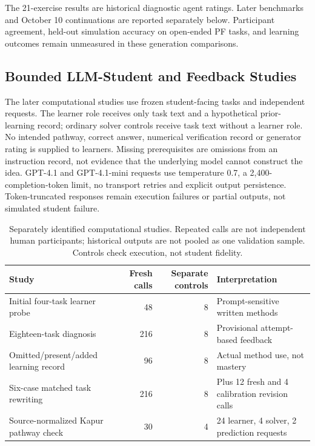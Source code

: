 The 21-exercise results are historical diagnostic agent ratings. Later benchmarks and October 10 continuations are reported separately below. Participant agreement, held-out simulation accuracy on open-ended PF tasks, and learning outcomes remain unmeasured in these generation comparisons.

\subsection{Bounded LLM-Student and Feedback Studies}

The later computational studies use frozen student-facing tasks and independent requests. The learner role receives only task text and a hypothetical prior-learning record; ordinary solver controls receive task text without a learner role. No intended pathway, correct answer, numerical verification record or generator rating is supplied to learners. Missing prerequisites are omissions from an instruction record, not evidence that the underlying model cannot construct the idea. GPT-4.1 and GPT-4.1-mini requests use temperature 0.7, a 2,400-completion-token limit, no transport retries and explicit output persistence. Token-truncated responses remain execution failures or partial outputs, not simulated student failure.

\begin{table}[h]
\centering
\small
\begin{tabular}{@{}p{5.6cm}rrp{4.1cm}@{}}
\toprule
\textbf{Study} & \textbf{Fresh calls} & \textbf{Separate controls} & \textbf{Interpretation} \\
\midrule
Initial four-task learner probe & 48 & 8 & Prompt-sensitive written methods \\
Eighteen-task diagnosis & 216 & 8 & Provisional attempt-based feedback \\
Omitted/present/added learning record & 96 & 8 & Actual method use, not mastery \\
Six-case matched task rewriting & 216 & 8 & Plus 12 fresh and 4 calibration revision calls \\
Source-normalized Kapur pathway check & 30 & 4 & 24 learner, 4 solver, 2 prediction requests \\
\bottomrule
\end{tabular}
\caption{Separately identified computational studies. Repeated calls are not independent human participants; historical outputs are not pooled as one validation sample. Controls check execution, not student fidelity.}
\label{tab:simulation-studies}
\end{table}

